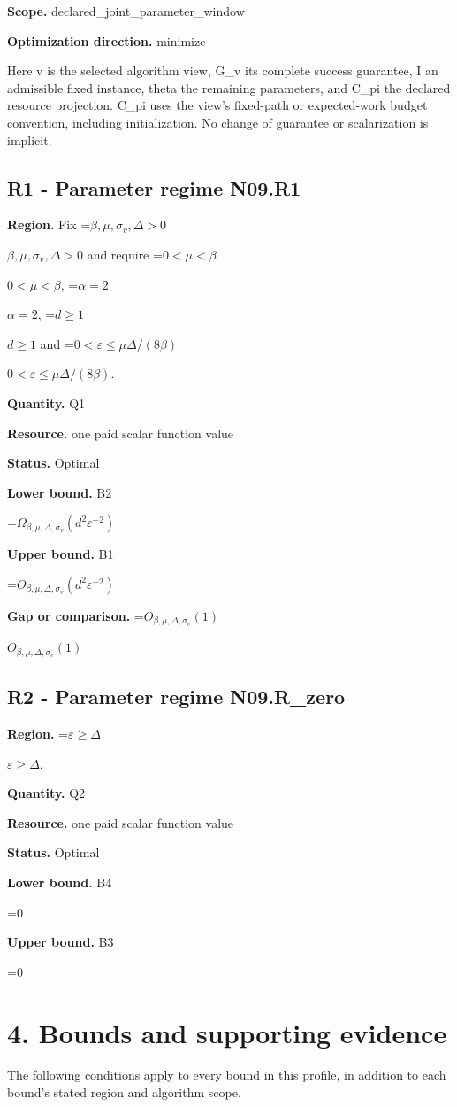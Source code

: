 \documentclass[10pt,a4paper]{article}
\newcommand{\AtlasMath}[1]{\par\begingroup\centering\setbox0=\hbox{$\displaystyle #1$}\ifdim\wd0>1.4\linewidth\typeout{ATLAS WIDE FORMULA: \the\wd0}\fi\ifdim\wd0>\linewidth\resizebox{\linewidth}{!}{\box0}\else\box0\fi\par\endgroup}
\newcommand{\AtlasInlineMath}[1]{\begingroup\setbox0=\hbox{$#1$}\ifdim\wd0>.4\linewidth\endgroup\AtlasMath{#1}\else\endgroup$#1$\fi}
\begin{document}
\textbf{Scope.} declared\_joint\_parameter\_window

\textbf{Optimization direction.} minimize

Here v is the selected algorithm view, G\_v its complete success guarantee, I an admissible fixed instance, theta the remaining parameters, and C\_pi the declared resource projection. C\_pi uses the view's fixed-path or expected-work budget convention, including initialization. No change of guarantee or scalarization is implicit.

\subsection{R1 - Parameter regime N09.R1}
\textbf{Region.} Fix \AtlasInlineMath{\beta,\mu,\sigma_v,\Delta>0} and require \AtlasInlineMath{0<\mu<\beta}, \AtlasInlineMath{\alpha=2}, \AtlasInlineMath{d\ge1} and \AtlasInlineMath{0<\varepsilon\le\mu\Delta/(8\beta)}.

\textbf{Quantity.} Q1

\textbf{Resource.} one paid scalar function value

\textbf{Status.} Optimal

\textbf{Lower bound.} B2

\AtlasMath{\Omega_{\beta,\mu,\Delta,\sigma_v}(d^2\varepsilon^{-2})}
\textbf{Upper bound.} B1

\AtlasMath{O_{\beta,\mu,\Delta,\sigma_v}(d^2\varepsilon^{-2})}
\textbf{Gap or comparison.} \AtlasInlineMath{O_{\beta,\mu,\Delta,\sigma_v}(1)}

\subsection{R2 - Parameter regime N09.R\_zero}
\textbf{Region.} \AtlasInlineMath{\varepsilon\ge\Delta}.

\textbf{Quantity.} Q2

\textbf{Resource.} one paid scalar function value

\textbf{Status.} Optimal

\textbf{Lower bound.} B4

\AtlasMath{0}
\textbf{Upper bound.} B3

\AtlasMath{0}
\section{4. Bounds and supporting evidence}
The following conditions apply to every bound in this profile, in addition to each bound's stated region and algorithm scope.
\end{document}
